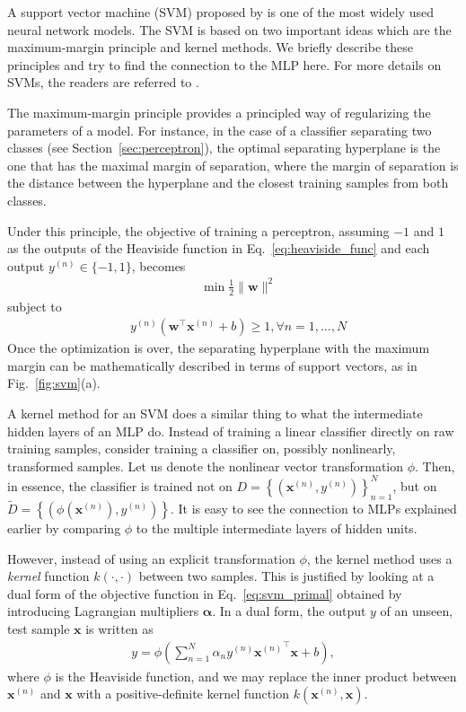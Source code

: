 \documentclass[dissertation,nocontribution,draft*]{aaltoseries}
\newcommand{\vect}[1]{\mathbf{#1}}
\newcommand{\vects}[1]{\boldsymbol{#1}}
\newcommand{\vx}[0]{\vect{x}}
\newcommand{\vw}[0]{\vect{w}}
\newcommand{\valpha}[0]{\vects{\alpha}}
\begin{document}
A support vector machine (SVM) proposed by
\citet{Cortes1995} is one of the most widely used neural
network models. The SVM is based on two important ideas
which are the maximum-margin principle and kernel methods.
We briefly describe these principles and try to find the
connection to the MLP here.  For more details on SVMs, the
readers are referred to \citep{Scholkopf2001}.

The maximum-margin principle provides a principled way of
regularizing the parameters of a model. For instance, in the
case of a classifier separating two classes (see
Section~\ref{sec:perceptron}), the optimal separating
hyperplane is the one that has the maximal margin of separation,
where the margin of separation is the distance between the
hyperplane and the closest training samples from both
classes.

Under this principle, the objective of training a
perceptron, assuming $-1$ and $1$ as the outputs of the
Heaviside function in Eq.~\eqref{eq:heaviside_func} and each
output $y^{(n)} \in \{ -1, 1 \}$, becomes
\begin{align}
    \label{eq:svm_primal}
    &\min \frac{1}{2} \| \vw \|^2
\end{align}
subject to
\begin{align*}
    &y^{(n)} \left( \vw^\top \vx^{(n)} + b \right) \geq 1,
    \forall n = 1, \dots , N
\end{align*}
Once the optimization is over, the separating hyperplane
with the maximum margin can be mathematically described in
terms of support vectors, as in Fig.~\ref{fig:svm}(a).

A kernel method 
for an SVM
does a similar thing to
what the intermediate hidden layers of an MLP do. Instead of
training a linear classifier directly on raw training
samples, consider training a classifier on, possibly
nonlinearly, transformed samples. Let us denote the
nonlinear vector transformation $\phi$. Then, in essence,
the classifier is trained not on $D = \left\{ \left(
\vx^{(n)}, y^{(n)} \right) \right\}_{n=1}^N$, but on
$\tilde{D} = \left\{ \left( \phi(\vx^{(n)}), y^{(n)} \right)
\right\}$. It is easy to see the connection to MLPs
explained earlier by comparing $\phi$ to the multiple
intermediate layers of hidden units.

However, instead of using an explicit transformation $\phi$,
the kernel method uses a \textit{kernel} function $k(\cdot,
\cdot)$ between two samples. This is justified by looking at
a dual form of the objective function in
Eq.~\eqref{eq:svm_primal} obtained by introducing Lagrangian
multipliers $\valpha$.  In a dual form, the output $y$ of an
unseen, test sample $\vx$ is written as
\begin{align*}
    y = \phi \left( \sum_{n=1}^N \alpha_n y^{(n)}
    {\vx^{(n)}}^\top \vx + b \right),
\end{align*}
where $\phi$ is the Heaviside function,
and we may replace the inner product between $\vx^{(n)}$ and
$\vx$  with a positive-definite kernel function
$k(\vx^{(n)}, \vx)$.
\end{document}
